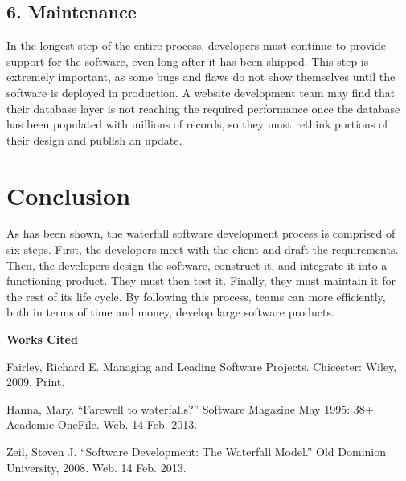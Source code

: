 \documentclass[12pt,letterpaper]{article}
\newcommand{\bibent}{\noindent \hangindent 40pt}
\newenvironment{workscited}{\newpage\begin{center} \large\bfseries Works Cited \end{center} \doublespacing}{\newpage}
\begin{document}
\subsection*{6. Maintenance}
In the longest step of the entire process, developers must continue to provide
support for the software, even long after it has been shipped.  This step is
extremely important, as some bugs and flaws do not show themselves until the
software is deployed in production.  A website development team may find that
their database layer is not reaching the required performance once the database
has been populated with millions of records, so they must rethink portions of
their design and publish an update.

\section*{Conclusion}
As has been shown, the waterfall software development process is comprised of
six steps.  First, the developers meet with the client and draft the
requirements.  Then, the developers design the software, construct it, and
integrate it into a functioning product.  They must then test it.  Finally, they
must maintain it for the rest of its life cycle.  By following this process,
teams can more efficiently, both in terms of time and money, develop large
software products.

\begin{workscited}

\bibent Fairley, Richard E. Managing and Leading Software Projects. Chicester:
Wiley, 2009. Print.

\bibent Hanna, Mary. ``Farewell to waterfalls?'' Software Magazine May 1995:
38+.  Academic OneFile. Web. 14 Feb. 2013.

\bibent Zeil, Steven J. ``Software Development: The Waterfall Model.'' Old
Dominion University, 2008. Web. 14 Feb. 2013.

\end{workscited}
\end{document}
